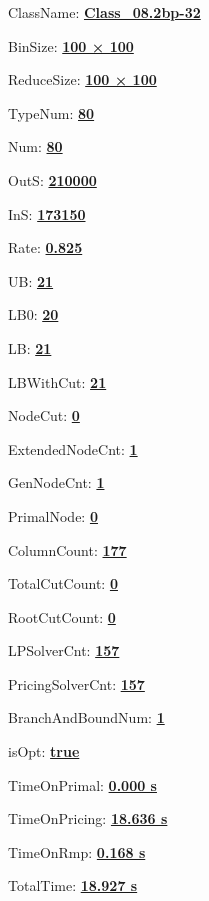 \documentclass[11pt]{article}
\begin{document}
\pagestyle{empty}


ClassName: \underline{\textbf{Class_08.2bp-32}}
\par
BinSize: \underline{\textbf{100 × 100}}
\par
ReduceSize: \underline{\textbf{100 × 100}}
\par
TypeNum: \underline{\textbf{80}}
\par
Num: \underline{\textbf{80}}
\par
OutS: \underline{\textbf{210000}}
\par
InS: \underline{\textbf{173150}}
\par
Rate: \underline{\textbf{0.825}}
\par
UB: \underline{\textbf{21}}
\par
LB0: \underline{\textbf{20}}
\par
LB: \underline{\textbf{21}}
\par
LBWithCut: \underline{\textbf{21}}
\par
NodeCut: \underline{\textbf{0}}
\par
ExtendedNodeCnt: \underline{\textbf{1}}
\par
GenNodeCnt: \underline{\textbf{1}}
\par
PrimalNode: \underline{\textbf{0}}
\par
ColumnCount: \underline{\textbf{177}}
\par
TotalCutCount: \underline{\textbf{0}}
\par
RootCutCount: \underline{\textbf{0}}
\par
LPSolverCnt: \underline{\textbf{157}}
\par
PricingSolverCnt: \underline{\textbf{157}}
\par
BranchAndBoundNum: \underline{\textbf{1}}
\par
isOpt: \underline{\textbf{true}}
\par
TimeOnPrimal: \underline{\textbf{0.000 s}}
\par
TimeOnPricing: \underline{\textbf{18.636 s}}
\par
TimeOnRmp: \underline{\textbf{0.168 s}}
\par
TotalTime: \underline{\textbf{18.927 s}}
\par
\newpage


\end{document}
